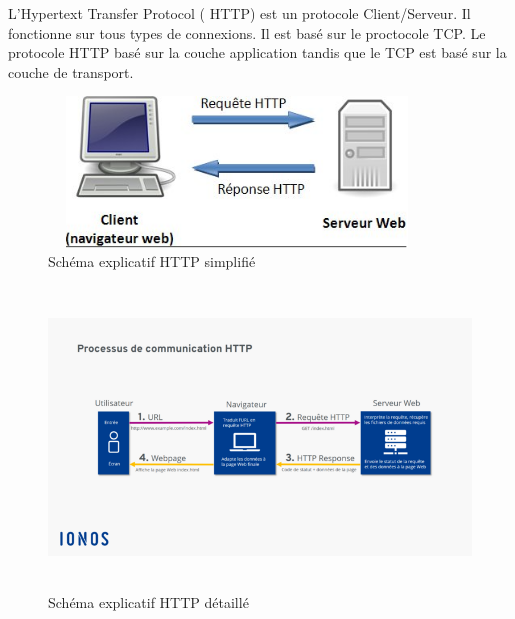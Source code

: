 L'Hypertext Transfer Protocol ( HTTP) est un protocole Client/Serveur. Il fonctionne sur tous types de connexions. Il est basé sur le proctocole TCP. 
Le protocole HTTP  basé sur la couche application tandis que le TCP est basé sur la couche de transport.
\begin{figure}[h]
    \centering
    \includegraphics[width=100mm, height=40mm]{images/HTTP2.png}
    \caption{Schéma explicatif HTTP simplifié}
    \label{img:mesh11}
\end{figure}
\begin{figure}[h]
    \centering
    \includegraphics[width=150mm, height=80mm]{images/HTTP1.png}
    \caption{Schéma explicatif HTTP détaillé}
    \label{img:mesh12}
\end{figure}
\newpage